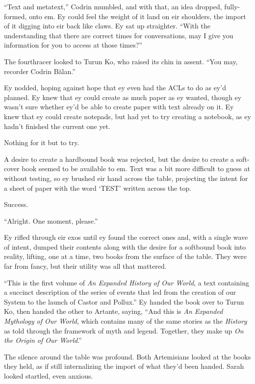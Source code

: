``Text and metatext,'' Codrin mumbled, and with that, an idea dropped, fully-formed, onto em. Ey could feel the weight of it land on eir shoulders, the import of it digging into eir back like claws. Ey sat up straighter. ``With the understanding that there are correct times for conversations, may I give you information for you to access at those times?''

The fourthracer looked to Turun Ko, who raised its chin in assent. ``You may, recorder Codrin Bălan.''

Ey nodded, hoping against hope that ey even had the ACLs to do as ey'd planned. Ey knew that ey could create as much paper as ey wanted, though ey wasn't sure whether ey'd be able to create paper with text already on it. Ey knew that ey could create notepads, but had yet to try creating a notebook, as ey hadn't finished the current one yet.

Nothing for it but to try.

A desire to create a hardbound book was rejected, but the desire to create a soft-cover book seemed to be available to em. Text was a bit more difficult to guess at without testing, so ey brushed eir hand across the table, projecting the intent for a sheet of paper with the word `TEST' written across the top.

Success.

``Alright. One moment, please.''

Ey rifled through eir exos until ey found the correct ones and, with a single wave of intent, dumped their contents along with the desire for a softbound book into reality, lifting, one at a time, two books from the surface of the table. They were far from fancy, but their utility was all that mattered.

``This is the first volume of \emph{An Expanded History of Our World}, a text containing a succinct description of the series of events that led from the creation of our System to the launch of Castor and Pollux.'' Ey handed the book over to Turun Ko, then handed the other to Artante, saying, ``And this is \emph{An Expanded Mythology of Our World}, which contains many of the same stories as the \emph{History} as told through the framework of myth and legend. Together, they make up \emph{On the Origin of Our World}.''

The silence around the table was profound. Both Artemisians looked at the books they held, as if still internalizing the import of what they'd been handed. Sarah looked startled, even anxious.

